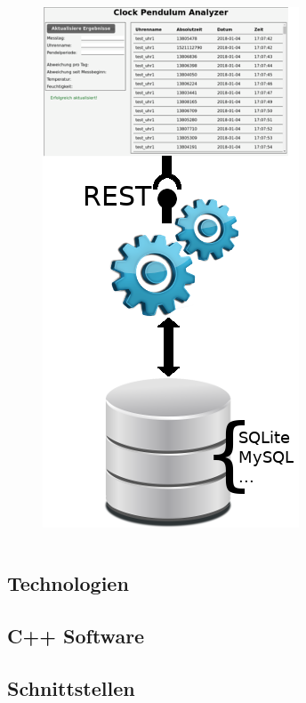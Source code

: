 \begin{frame}
\begin{columns}[c]
\begin{figure}
\begin{overprint}
                \includegraphics[width=.5\textwidth]{3layer_rest.png}
            \end{overprint}
        \end{figure}
    \end{columns}
\end{frame}

\subsection{Technologien}
\begin{frame}

\end{frame}

\subsection{C++ Software}
\begin{frame}

\end{frame}

\subsection{Schnittstellen}
\begin{frame}

\end{frame}